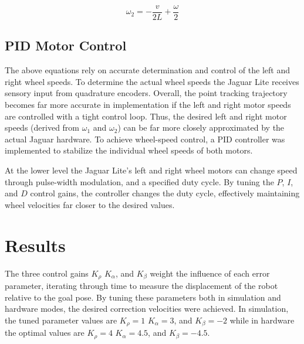 \documentclass[conference]{IEEEtran}
\begin{document}
\begin{equation}
\omega_2 = -\frac{v}{2L} + \frac{\omega}{2} 
\end{equation}

\subsection{PID Motor Control}
The above equations rely on accurate determination and control of the left and right
wheel speeds.  To determine the actual wheel speeds the Jaguar Lite receives 
sensory input from quadrature encoders. 
Overall, the point tracking trajectory becomes far more accurate in implementation
if the left and right motor speeds are controlled with a tight control loop.
Thus, the desired left and right motor speeds (derived from $\omega_1$ and $\omega_2$)
can be far more closely approximated by the actual Jaguar hardware.
To achieve wheel-speed control, a PID controller was implemented
to stabilize the individual wheel speeds of both motors.

At the lower level the Jaguar Lite's left and right wheel motors can 
change speed through pulse-width modulation, and a specified 
duty cycle.  By tuning the $P$, $I$, and $D$ control gains, the controller changes the 
duty cycle, effectively maintaining  
wheel velocities far closer to the desired values.


\section{Results}

The three control gains $K_{\rho}$ $K_{\alpha}$, and $K_{\beta}$ weight the influence 
of each error parameter, iterating through time to measure the displacement of the robot
relative to the goal pose. By tuning these parameters both in simulation and hardware modes, 
the desired correction velocities were achieved. In simulation, the tuned parameter values are 
$K_{\rho} = 1$ $K_{\alpha} =  3$, and $K_{\beta} = -2$ while in hardware the optimal values 
are $K_{\rho} = 4$ $K_{\alpha} =  4.5$, and $K_{\beta} = -4.5$.
\end{document}
